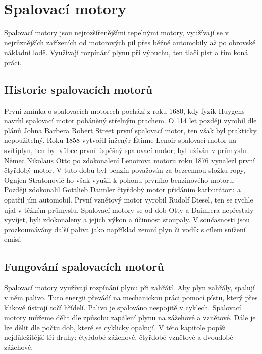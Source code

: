 \section{Spalovací motory}
{Spalovací motory jsou nejrozšířenějšími tepelnými motory, využívají se v nejrůznějších zařízeních od motorových pil přes běžné automobily až po obrovské nákladní lodě. Využívají rozpínání plynu při výbuchu, ten tlačí píst a tím koná práci.}
\subsection{Historie spalovacích motorů}\label{sc:HistorieSpalovacichMotoru}
{První zmínka o spalovacích motorech pochází z roku 1680, kdy fyzik Huygens navrhl spalovací motor poháněný střelným prachem. O 114 let později vyrobil dle plánů Johna Barbera Robert Street první spalovací motor, ten však byl prakticky nepoužitelný. Roku 1858 vytvořil inženýr Étinne Lenoir spalovací motor na svítiplyn, ten byl vůbec první úspěšný spalovací motor; byl užíván v průmyslu.}
\cite{vutb:vyzkumneSpalovaciMotory}\cite{ANNALS:TheHistoryOfTheInternalCombustionEngine}\odst
{Němec Nikolaus Otto po zdokonalení Lenoirova motoru roku 1876 vynalezl první čtyřdobý motor. V tuto dobu byl benzín považován za bezcennou složku ropy, Ognjen Stratonović ho však využil k pohonu prvního benzinového motoru. Později zdokonalil Gottlieb Daimler čtyřdobý motor přidáním karburátoru a opatřil jím automobil. První vznětový motor vyrobil Rudolf Diesel, ten se rychle ujal v těžkém průmyslu.}
\cite{vutb:vyzkumneSpalovaciMotory}\cite{ANNALS:TheHistoryOfTheInternalCombustionEngine}\odst
{Spalovací motory se od dob Otty a Daimlera nepřestaly vyvíjet, byli zdokonaleny a jejich výkon a účinnost stoupaly. V současnosti jsou prozkoumávány další paliva jako například zemní plyn či vodík s cílem snížení emisí.}
\cite{vutb:vyzkumneSpalovaciMotory}
\subsection{Fungování spalovacích motorů}
{Spalovací motory využívají rozpínání plynu při zahřátí. Aby plyn zahřály, spalují v něm palivo. Tuto energii převádí na mechanickou práci pomocí pístu, který přes klikové ústrojí točí hřídelí. Palivo je spalováno nespojitě v cyklech.}\odst
{Spalovací motory můžeme dělit dle způsobu zapálení plynu na zážehové a vznětové. Dále je lze dělit dle počtu dob, které se cyklicky opakují. V této kapitole popíši nejdůležitější tři druhy: čtyřdobé zážehové, čtyřdobé vznětové a dvoudobé zážehové.}
\cite{vutb:vyzkumneSpalovaciMotory}
\newpage
